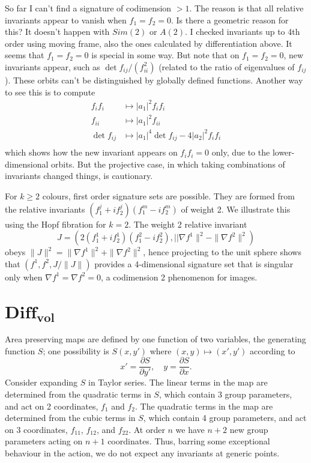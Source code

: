 \documentclass{article}
\begin{document}
{\color{red} So far I can't find a signature of codimension $>1$. The reason is that
all relative invariants appear to vanish when $f_1=f_2=0$. Is there a geometric reason for this?
It doesn't happen with $Sim(2)$ or $A(2)$. I checked invariants up to 4th order using moving frame, also the ones
calculated by differentiation above. It seems that $f_1=f_2=0$ is special in some way. But note that
on $f_1=f_2=0$, new invariants appear, such as $\det f_{ij}/(f_{ii}^2)$ (related to the ratio of eigenvalues
of $f_{ij}$). These orbits can't be distinguished by globally defined functions. Another way to see this is to compute
\begin{equation}
\begin{aligned}
f_i f_i & \mapsto |a_1|^2 f_i f_i \\
f_{ii} & \mapsto |a_1|^2 f_{ii}\\
\det f_{ij} & \mapsto |a_1|^4 \det f_{ij} - 4 |a_2|^2 f_i f_i\\
\end{aligned}
\end{equation}
which shows how the new invariant appears on $f_if_i=0$ only, due to the lower-dimensional orbits.
But the projective case, in which taking combinations of invariants changed things, is cautionary.
}

For $k\ge 2$ colours, first order signature sets are possible. They are formed from 
the relative invariants $(f^j_1 + i f^j_2)(f^m_1 - i f^m_2)$ of weight 2. We illustrate this
using the Hopf fibration for $k=2$. The weight 2 relative invariant
$$J = (2(f^1_1 + i f^1_2)(f^2_1 - i f^2_2), ||\nabla f^1\|^2 - \|\nabla f^2\|^2)$$
obeys $\|J\|^2 = \|\nabla f^1\|^2 + \|\nabla f^2\|^2$, hence projecting to the unit sphere
shows that $(f^1,f^2,J/\|J\|)$ provides a 4-dimensional signature set that is singular
only when $\nabla f^1 = \nabla f^2 = 0$, a codimension 2 phenomenon for images.

\section{{\bf $\mathbf{Diff_{vol}}$}}


Area preserving maps are defined by one function of two variables, the generating function $S$; one
possibility is $S(x,y')$ where $(x,y)\mapsto(x',y')$ according to
$$ x'=\frac{\partial S}{\partial y'},\quad y = \frac{\partial S}{\partial x}.$$
Consider expanding $S$ in Taylor series. The linear terms in the map
are determined from the quadratic terms in $S$, which contain 3 group parameters, and 
act on 2 coordinates, $f_1$ and $f_2$. 
The quadratic terms in the map are determined from the cubic terms in $S$, which contain 4 group parameters,
and act on 3 coordinates, $f_{11}$, $f_{12}$, and $f_{22}$. At order $n$ we have
$n+2$ new group parameters acting on $n+1$ coordinates. Thus, barring some exceptional behaviour
in the action, we do not expect any invariants at generic points.
\end{document}
